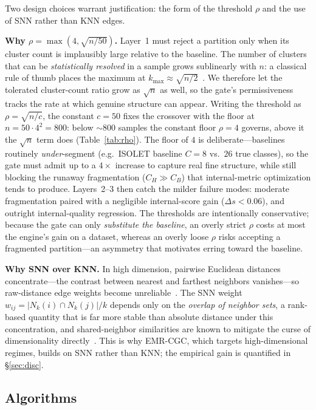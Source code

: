 \documentclass[conference]{IEEEtran}
\begin{document}
Two design choices warrant justification: the form of the threshold $\rho$ and the use of SNN rather than KNN edges.

\textbf{Why $\rho=\max(4,\sqrt{n/50})$.} Layer~1 must reject a partition only when its cluster count is implausibly large relative to the baseline. The number of clusters that can be \emph{statistically resolved} in a sample grows sublinearly with $n$: a classical rule of thumb places the maximum at $k_{\max}\approx\sqrt{n/2}$~\cite{mardia1979multivariate}. We therefore let the tolerated cluster-count ratio grow as $\sqrt{n}$ as well, so the gate's permissiveness tracks the rate at which genuine structure can appear. Writing the threshold as $\rho=\sqrt{n/c}$, the constant $c{=}50$ fixes the crossover with the floor at $n=50\cdot4^2=800$: below ${\sim}800$ samples the constant floor $\rho{=}4$ governs, above it the $\sqrt{n}$ term does (Table~\ref{tab:rho}). The floor of $4$ is deliberate---baselines routinely \emph{under}-segment (e.g.\ ISOLET baseline $C{=}8$ vs.\ $26$ true classes), so the gate must admit up to a $4\times$ increase to capture real fine structure, while still blocking the runaway fragmentation ($C_H\!\gg\!C_B$) that internal-metric optimization tends to produce. Layers~2--3 then catch the milder failure modes: moderate fragmentation paired with a negligible internal-score gain ($\Delta s<0.06$), and outright internal-quality regression. The thresholds are intentionally conservative; because the gate can only \emph{substitute the baseline}, an overly strict $\rho$ costs at most the engine's gain on a dataset, whereas an overly loose $\rho$ risks accepting a fragmented partition---an asymmetry that motivates erring toward the baseline.



\textbf{Why SNN over KNN.} In high dimension, pairwise Euclidean distances concentrate---the contrast between nearest and farthest neighbors vanishes---so raw-distance edge weights become unreliable~\cite{beyer1999nearest}. The SNN weight $w_{ij}=|N_k(i)\cap N_k(j)|/k$ depends only on the \emph{overlap of neighbor sets}, a rank-based quantity that is far more stable than absolute distance under this concentration, and shared-neighbor similarities are known to mitigate the curse of dimensionality directly~\cite{houle2010shared}. This is why EMR-CGC, which targets high-dimensional regimes, builds on SNN rather than KNN; the empirical gain is quantified in \S\ref{sec:disc}.

\subsection{Algorithms}
\end{document}

